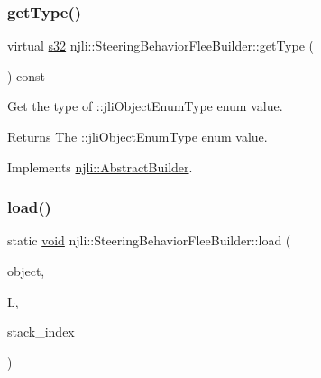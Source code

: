 \mbox{\label{classnjli_1_1_steering_behavior_flee_builder_a220154057d5925831cd3bbfb9cbe8eb4}} 
\subsubsection{\texorpdfstring{get\+Type()}{getType()}}
{\footnotesize\ttfamily virtual \mbox{\hyperlink{_util_8h_aa62c75d314a0d1f37f79c4b73b2292e2}{s32}} njli\+::\+Steering\+Behavior\+Flee\+Builder\+::get\+Type (\begin{DoxyParamCaption}{ }\end{DoxyParamCaption}) const\hspace{0.3cm}{\ttfamily [virtual]}}

Get the type of \+::jli\+Object\+Enum\+Type enum value.

\begin{DoxyReturn}{Returns}
The \+::jli\+Object\+Enum\+Type enum value. 
\end{DoxyReturn}


Implements \mbox{\hyperlink{classnjli_1_1_abstract_builder_abb4a8161cd71be12807fe85864b67050}{njli\+::\+Abstract\+Builder}}.

\mbox{\label{classnjli_1_1_steering_behavior_flee_builder_ab8800bc9b2bfd8d9908c535c8476ea59}} 
\subsubsection{\texorpdfstring{load()}{load()}}
{\footnotesize\ttfamily static \mbox{\hyperlink{_thread_8h_af1e856da2e658414cb2456cb6f7ebc66}{void}} njli\+::\+Steering\+Behavior\+Flee\+Builder\+::load (\begin{DoxyParamCaption}\item[{\mbox{\hyperlink{classnjli_1_1_steering_behavior_flee_builder}{Steering\+Behavior\+Flee\+Builder}} \&}]{object,  }\item[{lua\+\_\+\+State $\ast$}]{L,  }\item[{int}]{stack\+\_\+index }\end{DoxyParamCaption})\hspace{0.3cm}{\ttfamily [static]}}

